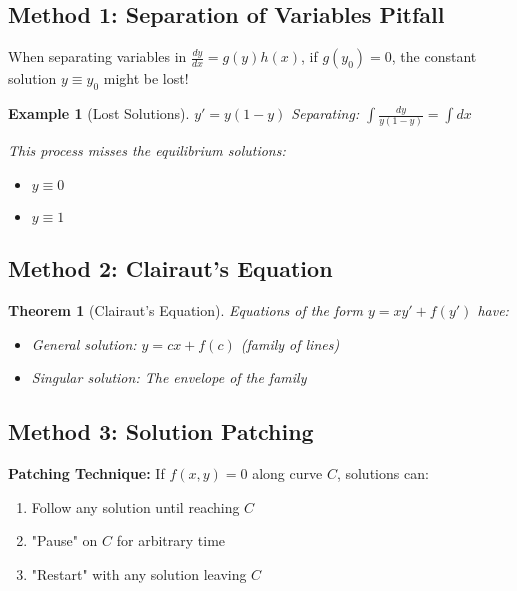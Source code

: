 \documentclass[12pt]{article}
\newtheorem{theorem}{Theorem}
\newtheorem{example}{Example}
\begin{document}
\subsection{Method 1: Separation of Variables Pitfall}

\begin{warning}
When separating variables in $\frac{dy}{dx} = g(y)h(x)$, if $g(y_0) = 0$, the constant solution $y \equiv y_0$ might be lost!
\end{warning}

\begin{example}[Lost Solutions]
$y' = y(1-y)$
Separating: $\int \frac{dy}{y(1-y)} = \int dx$

This process misses the equilibrium solutions:
\begin{itemize}
    \item $y \equiv 0$
    \item $y \equiv 1$
\end{itemize}
\end{example}

\subsection{Method 2: Clairaut's Equation}

\begin{theorem}[Clairaut's Equation]
Equations of the form $y = xy' + f(y')$ have:
\begin{itemize}
    \item General solution: $y = cx + f(c)$ (family of lines)
    \item Singular solution: The envelope of the family
\end{itemize}
\end{theorem}

\subsection{Method 3: Solution Patching}

\begin{mdframed}[backgroundcolor=yellow!10]
\textbf{Patching Technique:}
If $f(x,y) = 0$ along curve $C$, solutions can:
\begin{enumerate}
    \item Follow any solution until reaching $C$
    \item "Pause" on $C$ for arbitrary time
    \item "Restart" with any solution leaving $C$
\end{enumerate}
\end{mdframed}
\end{document}
